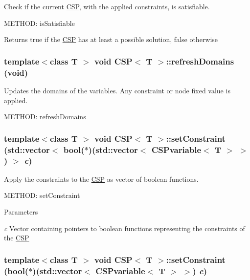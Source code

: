 Check if the current \hyperlink{classCSP}{CSP}, with the applied constraints, is satisfiable. 

METHOD: isSatisfiable \begin{DoxyReturn}{Returns}
true if the \hyperlink{classCSP}{CSP} has at least a possible solution, false otherwise 
\end{DoxyReturn}
\hypertarget{classCSP_a466845256e638c5e258fd728b641359f}{
\subsubsection[{refreshDomains}]{\setlength{\rightskip}{0pt plus 5cm}template$<$class T $>$ void {\bf CSP}$<$ T $>$::refreshDomains (void)}}
\label{classCSP_a466845256e638c5e258fd728b641359f}


Updates the domains of the variables. Any constraint or node fixed value is applied. 

METHOD: refreshDomains \hypertarget{classCSP_a457e1df05d4ec16be00118bda22fd882}{
\subsubsection[{setConstraint}]{\setlength{\rightskip}{0pt plus 5cm}template$<$class T $>$ void {\bf CSP}$<$ T $>$::setConstraint (std::vector$<$ bool($\ast$)(std::vector$<$ {\bf CSPvariable}$<$ T $>$ $>$) $>$ {\em c})}}
\label{classCSP_a457e1df05d4ec16be00118bda22fd882}


Apply the constraints to the \hyperlink{classCSP}{CSP} as vector of boolean functions. 

METHOD: setConstraint 
\begin{DoxyParams}{Parameters}
\item[{\em c}]Vector containing pointers to boolean functions representing the constraints of the \hyperlink{classCSP}{CSP} \end{DoxyParams}
\hypertarget{classCSP_a534a0d9bd10fb544f94196bf3c386657}{
\subsubsection[{setConstraint}]{\setlength{\rightskip}{0pt plus 5cm}template$<$class T $>$ void {\bf CSP}$<$ T $>$::setConstraint (bool($\ast$)(std::vector$<$ {\bf CSPvariable}$<$ T $>$ $>$) {\em c})}}
\label{classCSP_a534a0d9bd10fb544f94196bf3c386657}


